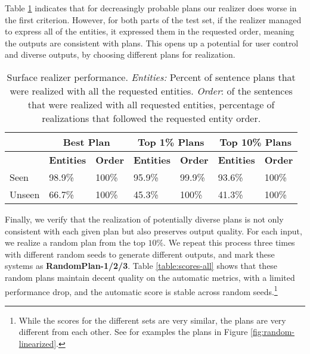 \documentclass[11pt,a4paper]{article}
\newcommand\ourrandom[1]{RandomPlan-#1}
\begin{document}
Table \ref{table:coverage} indicates that for decreasingly probable plans our realizer does worse in the first criterion. However, for both parts of the test set,
if the realizer managed to express all of the entities, it expressed them in the requested order, meaning the outputs are consistent with plans.
This opens up a potential for user control and diverse outputs, by choosing different plans for realization.

\begin{table}[!t]
\centering
\resizebox{\linewidth}{!}
{\begin{tabular}{|l|l|l|l|l|l|l|}
\hline
       & \multicolumn{2}{c|}{\textbf{Best Plan}} & \multicolumn{2}{c|}{\textbf{Top 1\% Plans}} & \multicolumn{2}{c|}{\textbf{Top 10\% Plans}}     \\ \hline
       & \textbf{Entities} & \textbf{Order} & \textbf{Entities} & \textbf{Order} & \textbf{Entities} & \textbf{Order} \\ \hline
Seen   & 98.9\%                  & 100\%                & 95.9\%                  & 99.9\%                & 93.6\%                  & 100\%                \\ \hline
Unseen & 66.7\%                  & 100\%                & 45.3\%                  & 100\%                & 41.3\%                  & 100\%                \\ \hline

\end{tabular}}
\centering

\caption{Surface realizer performance. \emph{Entities:} Percent of sentence plans that were realized with all the requested entities. \emph{Order}: of the sentences that were realized with all requested entities, percentage of realizations that followed the requested entity order.}
\label{table:coverage}
\end{table}





%
 
Finally, we verify that the realization of potentially diverse plans is not only consistent with each given plan but also preserves output quality.
For each input, we realize a random plan from the top $10\%$. We repeat this process three times with different random seeds to generate different outputs, and mark these systems as \textbf{\ourrandom{1/2/3}}. 
Table \ref{table:scores-all} shows that these random plans maintain decent quality on the automatic metrics, with a limited performance drop, and the automatic score is stable across random seeds.\footnote{While the scores for the different sets are very similar, the plans are very different from each other. See for examples the plans in Figure \ref{fig:random-linearized}.}  
\end{document}

